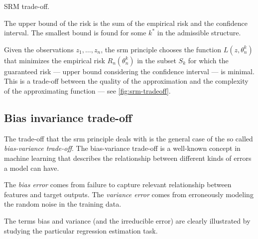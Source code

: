 \begin{figurebox}[label=fig:srm-tradeoff]{SRM trade-off.}
  \centering
  \tcblower
  The upper bound of the risk is the sum of the empirical risk and the confidence
  interval.  The smallest bound is found for some $k^*$ in the admissible structure.
\end{figurebox}

Given the observations $z_1, \dots, z_n$, the \gls{srm} principle chooses the function
$L(z, \theta_n^k)$ that minimizes the empirical risk $R_n(\theta_n^k)$ in the subset
$S_k$ for which the guaranteed risk --- upper bound considering the confidence interval
--- is minimal.  This is a trade-off between the quality of the approximation and the
complexity of the approximating function --- see \cref{fig:srm-tradeoff}.

\subsection{Bias invariance trade-off}

The trade-off that the \gls{srm} principle deals with is the general case of the so called
\emph{bias-variance trade-off}.  The bias-variance trade-off is a well-known concept in
machine learning that describes the relationship between different kinds of errors a model
can have.

The \emph{bias error} comes from failure to capture relevant relationship between features
and target outputs.  The \emph{variance error} comes from erroneously modeling the random
noise in the training data.

The terms bias and variance (and the irreducible error) are clearly illustrated by
studying the particular regression estimation task.

